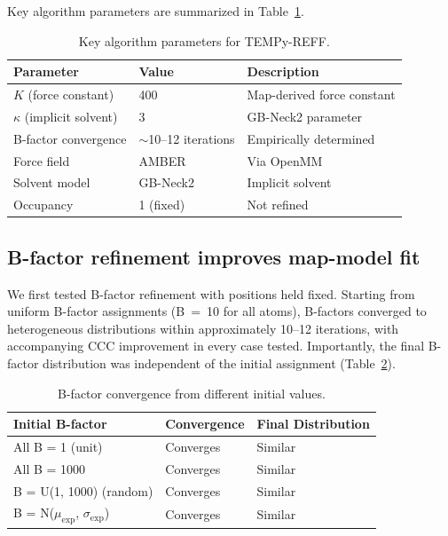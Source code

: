 \documentclass[11pt,a4paper]{article}
\begin{document}
Key algorithm parameters are summarized in Table~\ref{tab:params}.

\begin{table}[htbp]
\centering
\caption{Key algorithm parameters for TEMPy-REFF.}
\label{tab:params}
\begin{tabular}{lll}
\toprule
\textbf{Parameter} & \textbf{Value} & \textbf{Description} \\
\midrule
$K$ (force constant) & 400 & Map-derived force constant \\
$\kappa$ (implicit solvent) & 3 & GB-Neck2 parameter \\
B-factor convergence & $\sim$10--12 iterations & Empirically determined \\
Force field & AMBER & Via OpenMM \\
Solvent model & GB-Neck2 & Implicit solvent \\
Occupancy & 1 (fixed) & Not refined \\
\bottomrule
\end{tabular}
\end{table}

\subsection{B-factor refinement improves map-model fit}

We first tested B-factor refinement with positions held fixed. Starting from uniform B-factor assignments (B~=~10 for all atoms), B-factors converged to heterogeneous distributions within approximately 10--12 iterations, with accompanying CCC improvement in every case tested. Importantly, the final B-factor distribution was independent of the initial assignment (Table~\ref{tab:bfactor_init}).

\begin{table}[htbp]
\centering
\caption{B-factor convergence from different initial values.}
\label{tab:bfactor_init}
\begin{tabular}{lll}
\toprule
\textbf{Initial B-factor} & \textbf{Convergence} & \textbf{Final Distribution} \\
\midrule
All B = 1 (unit) & Converges & Similar \\
All B = 1000 & Converges & Similar \\
B = U(1, 1000) (random) & Converges & Similar \\
B = N($\mu_{\text{exp}}$, $\sigma_{\text{exp}}$) & Converges & Similar \\
\bottomrule
\end{tabular}
\end{table}
\end{document}
